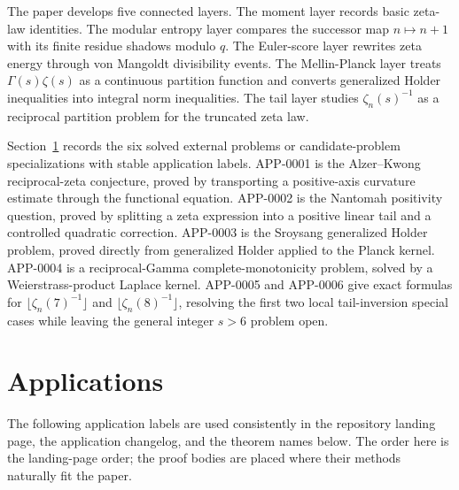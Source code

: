 \documentclass[11pt]{article}
\numberwithin{equation}{section}
\theoremstyle{definition}
\theoremstyle{remark}
\newcommand{\1}{\mathbf 1}
\begin{document}
The paper develops five connected layers.  The moment layer records basic zeta-law identities.  The modular entropy layer compares the successor map \(n\mapsto n+1\) with its finite residue shadows modulo \(q\).  The Euler-score layer rewrites zeta energy through von Mangoldt divisibility events.  The Mellin-Planck layer treats \(\Gamma(s)\zeta(s)\) as a continuous partition function and converts generalized Holder inequalities into integral norm inequalities.  The tail layer studies \(\zeta_n(s)^{-1}\) as a reciprocal partition problem for the truncated zeta law.

Section~\ref{sec:applications} records the six solved external problems or candidate-problem specializations with stable application labels.  APP-0001 is the Alzer--Kwong reciprocal-zeta conjecture, proved by transporting a positive-axis curvature estimate through the functional equation.  APP-0002 is the Nantomah positivity question, proved by splitting a zeta expression into a positive linear tail and a controlled quadratic correction.  APP-0003 is the Sroysang generalized Holder problem, proved directly from generalized Holder applied to the Planck kernel.  APP-0004 is a reciprocal-Gamma complete-monotonicity problem, solved by a Weierstrass-product Laplace kernel.  APP-0005 and APP-0006 give exact formulas for \(\lfloor \zeta_n(7)^{-1}\rfloor\) and \(\lfloor \zeta_n(8)^{-1}\rfloor\), resolving the first two local tail-inversion special cases while leaving the general integer \(s>6\) problem open.

\section{Applications}
\label{sec:applications}

The following application labels are used consistently in the repository landing page, the application changelog, and the theorem names below.  The order here is the landing-page order; the proof bodies are placed where their methods naturally fit the paper.
\end{document}
